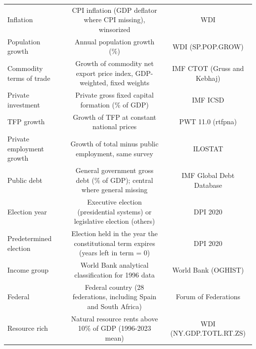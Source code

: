 \begin{table}[htbp]
\begin{tabular}{l*{2}{c}}
Inflation & CPI inflation (GDP deflator where CPI missing), winsorized & WDI \\
Population growth & Annual population growth (\%) & WDI (SP.POP.GROW) \\
Commodity terms of trade & Growth of commodity net export price index, GDP-weighted, fixed weights & IMF CTOT (Gruss and Kebhaj) \\
Private investment & Private gross fixed capital formation (\% of GDP) & IMF ICSD \\
TFP growth & Growth of TFP at constant national prices & PWT 11.0 (rtfpna) \\
Private employment growth & Growth of total minus public employment, same survey & ILOSTAT \\
Public debt & General government gross debt (\% of GDP); central where general missing & IMF Global Debt Database \\
Election year & Executive election (presidential systems) or legislative election (others) & DPI 2020 \\
Predetermined election & Election held in the year the constitutional term expires (years left in term = 0) & DPI 2020 \\
Income group & World Bank analytical classification for 1996 data & World Bank (OGHIST) \\
Federal & Federal country (28 federations, including Spain and South Africa) & Forum of Federations \\
Resource rich & Natural resource rents above 10\% of GDP (1996-2023 mean) & WDI (NY.GDP.TOTL.RT.ZS) \\
\bottomrule
\end{tabular}
\end{table}
